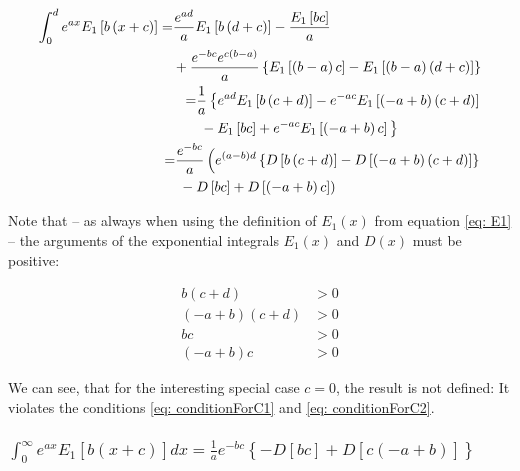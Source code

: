 \documentclass[bibliography=totocnumbered]{scrartcl}
\begin{document}
	\begin{align}
			\begin{split}
				\int_{0}^{d}e^{ax}E_1\left[b\left(x+c\right)\right]=&\frac{e^{ad}}{a}E_1\left[b\left(d+c\right)\right]-\frac{E_1\left[bc\right]}{a}\\
				&+\frac{e^{-bc}e^{c\left(b-a\right)}}{a}\left\{E_1\left[\left(b-a\right)c\right]-E_1\left[\left(b-a\right)\left(d+c\right)\right]\right\}
			\end{split}\\
			\begin{split}
				=&\frac{1}{a}\left\{e^{ad}E_1\left[b\left(c+d\right)\right]-e^{-ac}E_1\left[\left(-a+b\right)\left(c+d\right)\right]\right. \\
				&\left. {}-E_1\left[bc\right]+e^{-ac}E_1\left[\left(-a+b\right)c\right]\vphantom{e^{ad}}\right\}
			\end{split}\\
			\begin{split}
				=&\frac{e^{-bc}}{a}\left(e^{\left(a-b\right)d}\left\{D\left[b\left(c+d\right)\right]-D\left[\left(-a+b\right)\left(c+d\right)\right]\right\}\right.\\
				&\left. {}-D\left[bc\right]+D\left[\left(-a+b\right)c\right]\right)\label{eq: generalIntegralOfE1}
			\end{split}
	\end{align}

	Note that -- as always when using the definition of $E_1\left(x\right)$ from equation \eqref{eq: E1}  -- the arguments of the exponential integrals $E_1\left(x\right)$ and $D\left(x\right)$ must be positive:

	\begin{subequations}
	\begin{align}
		b\left(c+d\right)&>0\\
		\left(-a+b\right)\left(c+d\right)&>0\\
		bc&>0\label{eq: conditionForC1}\\
		\left(-a+b\right)c&>0\label{eq: conditionForC2}
	\end{align}
	\end{subequations}

	We can see, that for the interesting special case $c=0$, the result is not defined: It violates the conditions \eqref{eq: conditionForC1} and \eqref{eq: conditionForC2}.

	\subsubsection[A integral of E1(x), involving the exponential function]{$\int_{0}^{\infty}e^{ax}E_1\left[b\left(x+c\right)\right]dx=\frac{1}{a}e^{-bc}\left\{-D\left[bc\right]+D\left[c\left(-a+b\right)\right]\right\}$}
	\label{subsubsec: generalIntegralOfE2}
\end{document}
